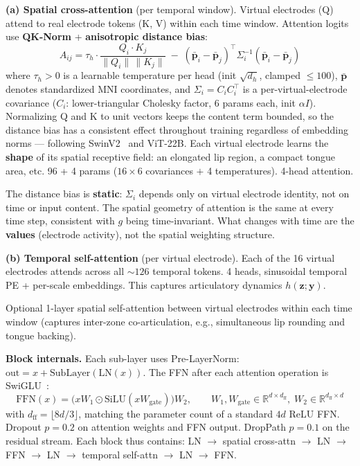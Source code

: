 \documentclass[11pt,letterpaper]{article}
\newcommand{\bfp}{\mathbf{p}}
\newcommand{\bfz}{\mathbf{z}}
\newcommand{\bfy}{\mathbf{y}}
\newcommand{\R}{\mathbb{R}}
\begin{document}
\textbf{(a) Spatial cross-attention} (per temporal window). Virtual electrodes (Q) attend to real electrode tokens (K, V) within each time window. Attention logits use \textbf{QK-Norm} + \textbf{anisotropic distance bias}:
\begin{equation}
A_{ij} = \tau_h \cdot \frac{Q_i \cdot K_j}{\|Q_i\|\,\|K_j\|} \;-\; (\bar{\bfp}_i - \bar{\bfp}_j)^\top \Sigma_i^{-1} (\bar{\bfp}_i - \bar{\bfp}_j)
\end{equation}
where $\tau_h > 0$ is a learnable temperature per head (init $\sqrt{d_h}$, clamped $\leq 100$), $\bar{\bfp}$ denotes standardized MNI coordinates, and $\Sigma_i = C_i C_i^\top$ is a per-virtual-electrode covariance ($C_i$: lower-triangular Cholesky factor, 6 params each, init $\alpha I$). Normalizing Q and K to unit vectors keeps the content term bounded, so the distance bias has a consistent effect throughout training regardless of embedding norms --- following SwinV2~\cite{liu2022swinv2} and ViT-22B. Each virtual electrode learns the \textbf{shape} of its spatial receptive field: an elongated lip region, a compact tongue area, etc. 96 + 4 params ($16 \times 6$ covariances $+$ 4 temperatures). 4-head attention.

The distance bias is \textbf{static}: $\Sigma_i$ depends only on virtual electrode identity, not on time or input content. The spatial geometry of attention is the same at every time step, consistent with $g$ being time-invariant. What changes with time are the \textbf{values} (electrode activity), not the spatial weighting structure.

\textbf{(b) Temporal self-attention} (per virtual electrode). Each of the 16 virtual electrodes attends across all ${\sim}126$ temporal tokens. 4 heads, sinusoidal temporal PE + per-scale embeddings. This captures articulatory dynamics $h(\bfz; \bfy)$.

Optional 1-layer spatial self-attention between virtual electrodes within each time window (captures inter-zone co-articulation, e.g., simultaneous lip rounding and tongue backing).

\textbf{Block internals.} Each sub-layer uses Pre-LayerNorm: $\text{out} = x + \text{SubLayer}(\text{LN}(x))$. The FFN after each attention operation is SwiGLU~\cite{shazeer2020}:
\begin{equation}
\text{FFN}(x) = \bigl(x W_1 \odot \text{SiLU}(x W_{\text{gate}})\bigr) W_2, \qquad W_1, W_{\text{gate}} \in \R^{d \times d_{\text{ff}}},\; W_2 \in \R^{d_{\text{ff}} \times d}
\end{equation}
with $d_{\text{ff}} = \lfloor 8d/3 \rfloor$, matching the parameter count of a standard $4d$ ReLU FFN. Dropout $p{=}0.2$ on attention weights and FFN output. DropPath $p{=}0.1$ on the residual stream. Each block thus contains: LN $\to$ spatial cross-attn $\to$ LN $\to$ FFN $\to$ LN $\to$ temporal self-attn $\to$ LN $\to$ FFN.
\end{document}
